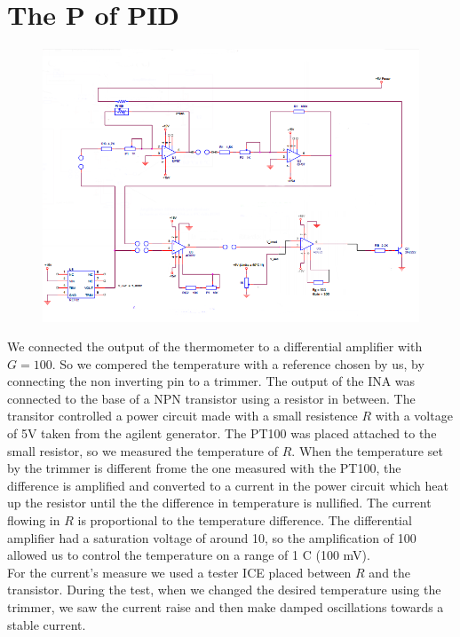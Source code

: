 \section{The P of PID}
\begin{figure}[H]
\centering
\includegraphics[width=.8\textwidth]{6/circuit2.png}
\end{figure}
We connected the output of the thermometer to a differential amplifier with $G=100$. So we compered the temperature with a reference chosen by us, by connecting the non inverting pin to a trimmer. The output of the INA was connected to the base of a NPN transistor using a resistor in between. The transitor controlled a power circuit made with a small resistence $R$ with a voltage of 5V taken from the agilent generator. The PT100 was placed attached to the small resistor, so we measured the temperature of $R$. When the temperature set by the trimmer is different frome the one measured with the PT100, the difference is amplified and converted to a current in the power circuit which heat up the resistor until the the difference in temperature is nullified. The current flowing in $R$ is proportional to the temperature difference. The differential amplifier had a saturation voltage of around 10, so the amplification of 100 allowed us to control the temperature on a range of 1 \degree C (100 mV).\\
For the current's measure we used a tester ICE placed between $R$ and the transistor. During the test, when we changed the desired temperature using the trimmer, we saw the current raise and then make damped oscillations towards a stable current.